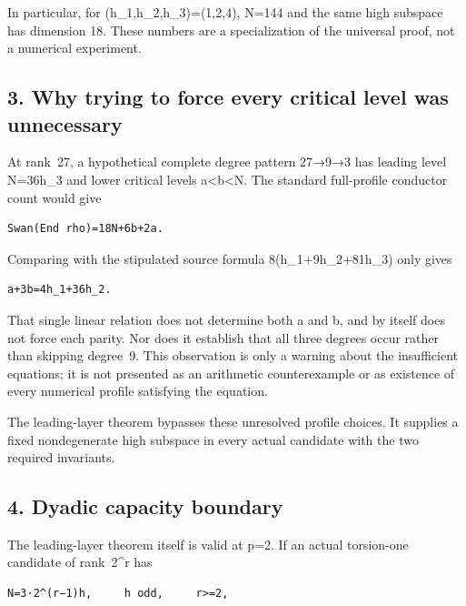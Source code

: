 In particular, for (h\_1,h\_2,h\_3)=(1,2,4), N=144 and the same high
subspace has dimension 18. These numbers are a specialization of the
universal proof, not a numerical experiment.

\hypertarget{odd_capacity-why-trying-to-force-every-critical-level-was-unnecessary}{%
\subsection{3. Why trying to force every critical level was
unnecessary}\label{odd_capacity-why-trying-to-force-every-critical-level-was-unnecessary}}

At rank~27, a hypothetical complete degree pattern 27→9→3 has leading
level N=36h\_3 and lower critical levels a\textless b\textless N. The
standard full-profile conductor count would give

\begin{Verbatim}[fontsize=\small,breaklines=true,breakanywhere=true]
Swan(End rho)=18N+6b+2a.
\end{Verbatim}

Comparing with the stipulated source formula 8(h\_1+9h\_2+81h\_3) only
gives

\begin{Verbatim}[fontsize=\small,breaklines=true,breakanywhere=true]
a+3b=4h_1+36h_2.
\end{Verbatim}

That single linear relation does not determine both a and b, and by
itself does not force each parity. Nor does it establish that all three
degrees occur rather than skipping degree~9. This observation is only a
warning about the insufficient equations; it is not presented as an
arithmetic counterexample or as existence of every numerical profile
satisfying the equation.

The leading-layer theorem bypasses these unresolved profile choices. It
supplies a fixed nondegenerate high subspace in every actual candidate
with the two required invariants.

\hypertarget{odd_capacity-dyadic-capacity-boundary}{%
\subsection{4. Dyadic capacity
boundary}\label{odd_capacity-dyadic-capacity-boundary}}

The leading-layer theorem itself is valid at p=2. If an actual
torsion-one candidate of rank~2\^{}r has

\begin{Verbatim}[fontsize=\small,breaklines=true,breakanywhere=true]
N=3·2^(r−1)h,     h odd,     r>=2,
\end{Verbatim}

